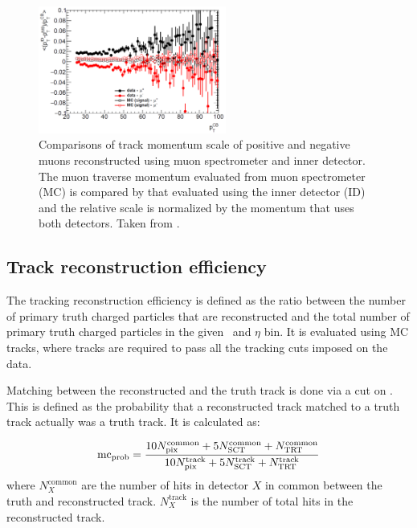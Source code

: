 \begin{figure}[h]
\centering
\includegraphics[width=0.55\textwidth]{figures/main/corrections/MuonPerf.pdf}
\caption{Comparisons of track momentum scale of positive and negative muons reconstructed using muon spectrometer and inner detector.
The muon traverse momentum evaluated from muon spectrometer (MC) is compared by that evaluated using the inner detector (ID) and the relative scale is normalized by the momentum that uses both detectors.
Taken from \cite{Bold:2194917}.}
\label{fig:ChMomentumScale}
\end{figure}


\subsection{Track reconstruction efficiency}
\label{sec:trackreco}

The tracking reconstruction efficiency is defined as the ratio between the number of primary truth charged particles that are reconstructed and the total number of primary truth charged particles in the given \pt\ and $\eta$ bin.
It is evaluated using MC tracks, where tracks are required to pass all the tracking cuts imposed on the data.

Matching between the reconstructed and the truth track is done via a cut on \mcprob.
This is defined as the probability that a reconstructed track matched to a truth track actually was a truth track.
It is calculated as:

\begin{align}
\mbox{${\mathrm{mc}}_{\mathrm{prob}}$} = \frac{10N^{\mathrm{common}}_{\mathrm{pix}} + 5N^{\mathrm{common}}_{\mathrm{SCT}} + N^{\mathrm{common}}_{\mathrm{TRT}}}{10N^{\mathrm{track}}_{\mathrm{pix}} + 5 N^{\mathrm{track}}_{\mathrm{SCT}} + N^{\mathrm{track}}_{\mathrm{TRT}}}
\end{align}
where $N^{\mathrm{common}}_X$  are the number of hits in detector $X$ in common between the truth and reconstructed track.
$N^{\mathrm{track}}_X$ is the number of total hits in the reconstructed track.

